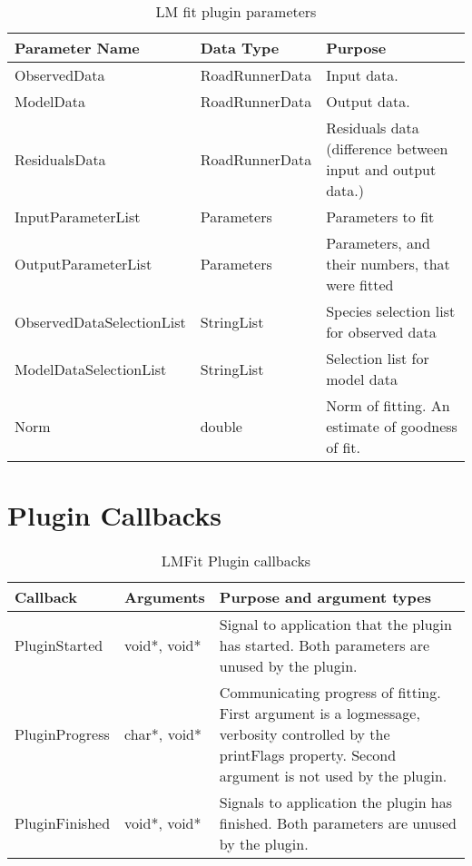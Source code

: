 \begin{table}[ht]
\centering %
\begin{tabular}{l l p{7.5cm}} %

Parameter Name & Data Type & Purpose \\ [0.5ex] %
\hline %
ObservedData   				& 	RoadRunnerData 		& 	Input data.  \\
ModelData      				& 	RoadRunnerData    	& 	Output data. \\
ResidualsData  				& 	RoadRunnerData    	& 	Residuals data (difference between input and output data.) \\
InputParameterList 			&	Parameters   		& 	Parameters to fit \\
OutputParameterList 		&   Parameters  	 	& 	Parameters, and their numbers, that were fitted \\
ObservedDataSelectionList 	& 	StringList			&	Species selection list for observed data \\
ModelDataSelectionList 		& 	StringList			&	Selection list for model data \\
Norm						&	double				& 	Norm of fitting. An estimate of goodness of fit. \\

\hline %
\end{tabular}
\caption{LM fit plugin parameters} 
\label{table:lmfitPluginParameters} 
\end{table}

\section{Plugin Callbacks}
\begin{table}[ht]
\centering %
\begin{tabular}{l l p{7.5cm}} %

Callback & Arguments & Purpose and argument types \\ [0.5ex] %
\hline %
PluginStarted  	& 	void*, void*  & Signal to application that the plugin has started. Both parameters are unused by the plugin.\\
PluginProgress	& 	char*, void*  & Communicating progress of fitting. First argument is a logmessage, verbosity controlled by the printFlags property. Second argument is not used by the plugin. \\
PluginFinished	& 	void*, void*  & Signals to application the plugin has finished. Both parameters are unused by the plugin.\\

\hline %
\end{tabular}
\caption{LMFit Plugin callbacks} 
\label{table:lmfitPluginCallBacks} 
\end{table}

